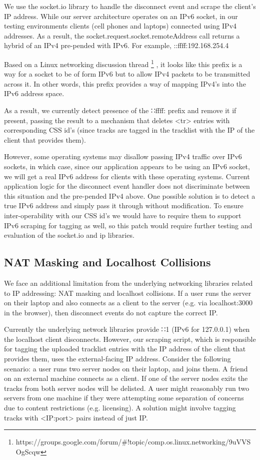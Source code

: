 \documentclass[12pt]{article}
\begin{document}
We use the socket.io library to handle the disconnect event and scrape the client’s IP address. While our server architecture operates on an IPv6 socket, in our testing environments clients (cell phones and laptops) connected using IPv4 addresses. As a result, the socket.request.socket.remoteAddress call returns a hybrid of an IPv4 pre-pended with IPv6. For example,  ::ffff:192.168.254.4

Based on a Linux networking discussion thread \footnote{https://groups.google.com/forum/\#!topic/comp.os.linux.networking/9uVVSOgScqw} , it looks like this prefix is a way for a socket to be of form IPv6 but to allow IPv4 packets to be transmitted across it. In other words, this prefix provides a way of mapping IPv4's into the IPv6 address space.

As a result, we currently detect presence of the ∷ffff: prefix and remove it if present, passing the result to a mechanism that deletes <tr> entries with corresponding CSS id’s (since tracks are tagged in the tracklist with the IP of the client that provides them).

However, some operating systems may disallow passing IPv4 traffic over IPv6 sockets, in which case, since our application appears to be using an IPv6 socket, we will get a real IPv6 address for clients with these operating systems. Current application logic for the disconnect event handler does not discriminate between this situation and the pre-pended IPv4 above. One possible solution is to detect a true IPv6 address and simply pass it through without modification. To ensure inter-operability with our CSS id’s we would have to require them to support IPv6 scraping for tagging as well, so this patch would require further testing and evaluation of the socket.io and ip libraries.

\subsection{NAT Masking and Localhost Collisions}
We face an additional limitation from the underlying networking libraries related to IP addressing: NAT masking and localhost collisions. If a user runs the server on their laptop and also connects as a client to the server (e.g. via localhost:3000 in the browser), then disconnect events do not capture the correct IP.

Currently the underlying network libraries provide ∷1 (IPv6 for 127.0.0.1) when the localhost client disconnects. However, our scraping script, which is responsible for tagging the uploaded tracklist entries with the IP address of the client that provides them, uses the external-facing IP address. Consider the following scenario: a user runs two server nodes on their laptop, and joins them. A friend on an external machine connects as a client. If one of the server nodes exits the tracks from both server nodes will be delisted. A user might reasonably run two servers from one machine if they were attempting some separation of concerns due to content restrictions (e.g. licensing). A solution might involve tagging tracks with <IP:port> pairs instead of just IP.
\end{document}
